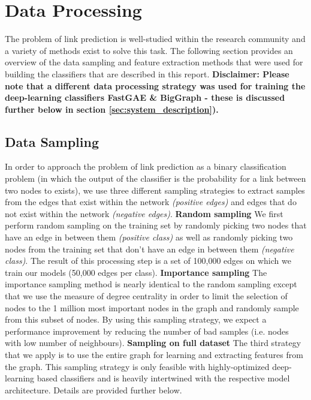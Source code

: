 \documentclass[11pt, oneside]{article}
\begin{document}
\section{Data Processing}
\vspace{-5pt}
The problem of link prediction is well-studied within the research community and a variety of methods exist to solve this task. The following section provides an overview of the data sampling and feature extraction methods that were used for building the classifiers that are described in this report. 
\newline
\textbf{Disclaimer: Please note that a different data processing strategy was used for training the deep-learning classifiers FastGAE \& BigGraph - these is discussed further below in section \ref{sec:system_description}).}

\vspace{-10pt}
\subsection{Data Sampling}
\vspace{-5pt}
In order to approach the problem of link prediction as a binary classification problem (in which the output of the classifier is the probability for a link between two nodes to exists), we use three different sampling strategies to extract samples from the edges that exist within the network \textit{(positive edges)} and edges that do not exist within the network \textit{(negative edges)}.
\newline
\textbf{Random sampling}
\newline
We first perform random sampling on the training set by randomly picking two nodes that have an edge in between them \textit{(positive class)} as well as randomly picking two nodes from the training set that don't have an edge in between them \textit{(negative class)}. The result of this processing step is a set of 100,000 edges on which we train our models (50,000 edges per class).
\newline
\textbf{Importance sampling}
\newline
The importance sampling method is nearly identical to the random sampling except that we use the measure of degree centrality in order to limit the selection of nodes to the 1 million most important nodes in the graph and randomly sample from this subset of nodes. By using this sampling strategy, we expect a performance improvement by reducing the number of bad samples (i.e. nodes with low number of neighbours).
\newline
\textbf{Sampling on full dataset}
\newline
The third strategy that we apply is to use the entire graph for learning and extracting features from the graph. This sampling strategy is only feasible with highly-optimized deep-learning based classifiers and is heavily intertwined with the respective model architecture. Details are provided further below.
\end{document}
